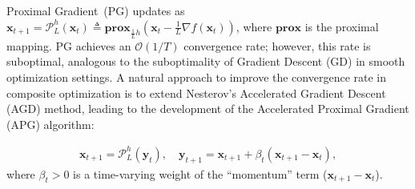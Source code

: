 \documentclass[a4paper]{article}
\numberwithin{equation}{section}
\theoremstyle{definition}
\theoremstyle{definition}
\def \O {\mathcal{O}}
\def \P {\mathcal{P}}
\def \x {\textbf{x}}
\def \y {\textbf{y}}
\def \prox {\textbf{prox}}
\begin{document}
Proximal Gradient~(PG) updates as $\x_{t+1} = \P^h_L(\x_t) \triangleq \prox_{\frac{1}{L} h} (\x_t - \frac{1}{L} \nabla f(\x_t))$, where $\prox$ is the proximal mapping. PG achieves an $\O(1/T)$ convergence rate; however, this rate is suboptimal, analogous to the suboptimality of Gradient Descent (GD) in smooth optimization settings. A natural approach  to improve the convergence rate in composite optimization is to extend Nesterov’s Accelerated Gradient Descent (AGD) method, leading to the development of the Accelerated Proximal Gradient (APG) algorithm:
\begin{tcolorbox}[top=-1pt]
  \begin{align*}
    \x_{t+1} = \P^h_L(\y_t),\quad \y_{t+1} = \x_{t+1} + \beta_t(\x_{t+1} - \x_t),
  \end{align*}
  where $\beta_t > 0$ is a time-varying weight of the ``momentum'' term ($\x_{t+1} - \x_t$). 
\end{tcolorbox}
\end{document}
